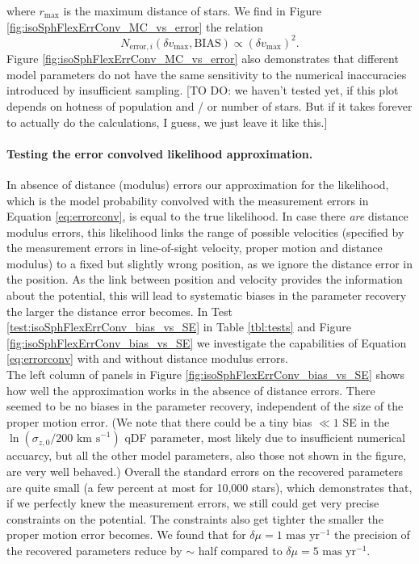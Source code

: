 where $r_\text{max}$ is the maximum distance of stars. We find in Figure \ref{fig:isoSphFlexErrConv_MC_vs_error} the relation
\begin{equation*}
N_{\text{error},i} (\delta v_\text{max},\text{BIAS}) \propto \left( \delta v_\text{max} \right)^2.
\end{equation*}
Figure \ref{fig:isoSphFlexErrConv_MC_vs_error} also demonstrates that different model parameters do not have the same sensitivity to the numerical inaccuracies introduced by insufficient sampling. [TO DO: we haven't tested yet, if this plot depends on hotness of population and / or number of stars. But if it takes forever to actually do the calculations, I guess, we just leave it like this.]

\paragraph{Testing the error convolved likelihood approximation.} In absence of distance (modulus) errors our approximation for the likelihood, which is the model probability convolved with the measurement errors in Equation \ref{eq:errorconv}, is equal to the true likelihood. In case there \emph{are} distance modulus errors, this likelihood links the range of possible velocities (specified by the measurement errors in line-of-sight velocity, proper motion and distance modulus) to a fixed but slightly wrong position, as we ignore the distance error in the position. As the link between position and velocity provides the information about the potential, this will lead to systematic biases in the parameter recovery the larger the distance error becomes. In Test \ref{test:isoSphFlexErrConv_bias_vs_SE} in Table \ref{tbl:tests} and Figure \ref{fig:isoSphFlexErrConv_bias_vs_SE} we investigate the capabilities of Equation \ref{eq:errorconv} with and without distance modulus errors.
\\The left column of panels in Figure \ref{fig:isoSphFlexErrConv_bias_vs_SE} shows how well the approximation works in the absence of distance errors. There seemed to be no biases in the parameter recovery, independent of the size of the proper motion error. (We note that there could be a tiny bias $\ll 1$ SE in the $\ln(\sigma_{z,0} / 200\text{ km s}^{-1})$ qDF parameter, most likely due to insufficient numerical accuarcy, but all the other model parameters, also those not shown in the figure, are very well behaved.) Overall the standard errors on the recovered parameters are quite small (a few percent at most for 10,000 stars), which demonstrates that, if we perfectly knew the measurement errors, we still could get very precise constraints on the potential. The constraints also get tighter the smaller the proper motion error becomes. We found that for $\delta \mu = 1 \text{ mas yr}^{-1}$ the precision of the recovered parameters reduce by $\sim$ half compared to $\delta \mu = 5 \text{ mas yr}^{-1}$.
